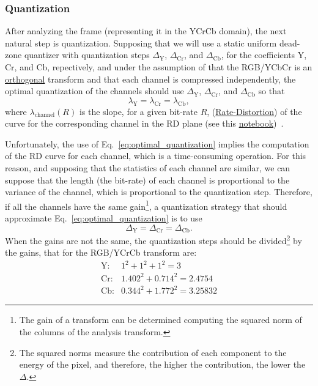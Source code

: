 \subsubsection{Quantization}
After analyzing the frame (representing it in the YCrCb domain), the
next natural step is quantization. Supposing that we will use a static
uniform dead-zone quantizer with quantization steps
$\Delta_{\text{Y}}$, $\Delta_{\text{Cr}}$, and $\Delta_{\text{Cb}}$,
for the coefficients Y, Cr, and Cb, repectively, and under the
assumption of that the RGB/YCbCr is an
\href{https://en.wikipedia.org/wiki/Orthogonality}{orthogonal}
transform and that each channel is compressed independently, the
optimal quantization of the channels should use $\Delta_{\text{Y}}$,
$\Delta_{\text{Cr}}$, and $\Delta_{\text{Cb}}$ so that
\begin{equation}
  \lambda_{\text{Y}} = \lambda_{\text{Cr}} = \lambda_{\text{Cb}},
  \label{eq:optimal_quantization}
\end{equation}
where $\lambda_{\text{channel}}(R)$ is the slope, for a given bit-rate
$R$,
(\href{https://en.wikipedia.org/wiki/Rate-distortion_theory}{Rate-Distortion})
of the curve for the corresponding channel in the RD plane (see this
\href{https://github.com/Sistemas-Multimedia/Sistemas-Multimedia.github.io/blob/master/study_guide/06-color_transform/performance.ipynb}{notebook})~\cite{vetterli1995wavelets,sayood2017introduction}.

Unfortunately, the use of Eq.~\ref{eq:optimal_quantization} implies
the computation of the RD curve for each channel, which is a
time-consuming operation. For this reason, and supposing that the
statistics of each channel are similar, we can suppose that the length
(the bit-rate) of each channel is proportional to the variance of the
channel, which is proportional to the quantization step. Therefore, if
all the channels have the same gain\footnote{The gain of a transform
can be determined computing the squared norm of the columns of the
analysis transform.}, a quantization strategy that should approximate
Eq.~\ref{eq:optimal_quantization} is to use
\begin{equation}
  \Delta_{\text{Y}} = \Delta_{\text{Cr}} = \Delta_{\text{Cb}}.
  \label{eq:simple_Q}
\end{equation}
When the gains are not the same, the quantization steps should be
divided\footnote{The squared norms measure the contribution of each
component to the energy of the pixel, and therefore, the higher the
contribution, the lower the $\Delta$.} by the gains, that for the
RGB/YCrCb transform are:
\begin{equation*}
  \begin{array}{rl}
    \text{Y}: & 1^2 + 1^2 + 1^2 = 3\\
    \text{Cr}: & 1.402^2 + 0.714^2 = 2.4754\\
    \text{Cb}: & 0.344^2 + 1.772^2 = 3.25832
  \end{array}
\end{equation*}

